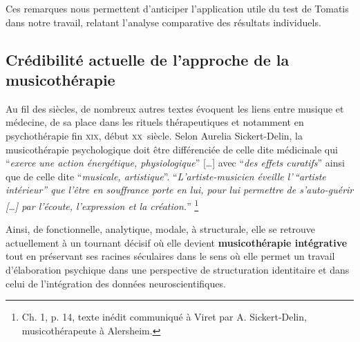 Ces remarques nous permettent d'anticiper
l'application utile du test de Tomatis dans notre travail, relatant l'analyse
comparative des résultats individuels.


\subsection{Crédibilité actuelle de l'approche de la musicothérapie }


Au fil des siècles, de nombreux autres
textes évoquent les liens entre musique et médecine, de sa place dans les
rituels thérapeutiques et notamment en psychothérapie fin \textsc{xix}\ieme,
début \textsc{xx}\ieme\ siècle.
Selon Aurelia Sickert-Delin, la musicothérapie
psychologique doit être différenciée de celle dite médicinale qui
\enquote{\emph{exerce une action
énergétique, physiologique}} [\dots] avec \enquote{\emph{des effets curatifs}}
ainsi que de celle dite \enquote{\emph{musicale, artistique}}.
\enquote{\emph{L'artiste-musicien éveille l'\,``artiste intérieur'' que l'être
en souffrance porte en lui, pour lui permettre de s'auto-guérir [\dots] par
l'écoute, l'expression et la création.}}
\autocite {viret:b} \footnote{ Ch. 1,  p. 14, texte
inédit communiqué à Viret par A. Sickert-Delin, musicothérapeute à Alersheim.}

 Ainsi, de fonctionnelle, analytique, mo\-da\-le,  à
struc\-tu\-rale, elle se retrouve actuellement
 à un tournant décisif où elle devient
 \textbf{ musicothérapie intégrative} tout en préservant ses racines
 séculaires dans le sens où elle permet un travail d'élaboration psychique dans une perspective de structuration identitaire \autocite[ch. III, p. 53,
105]{vrait_musicotherapie_2018} et dans celui de l'intégration des données
neuroscientifiques.






